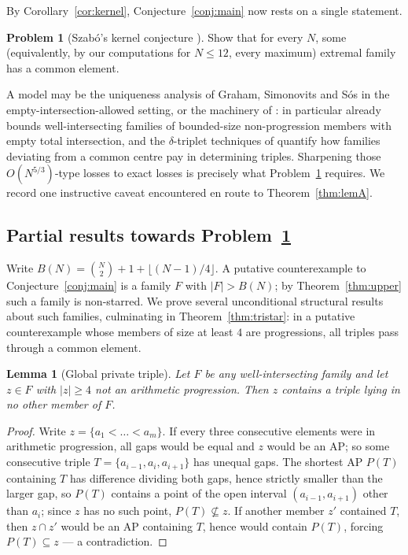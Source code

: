\documentclass[11pt]{article}
\newtheorem{lemma}[theorem]{Lemma}
\theoremstyle{definition}
\newtheorem{problem}[theorem]{Problem}
\begin{document}
By Corollary~\ref{cor:kernel}, Conjecture~\ref{conj:main} now rests on a single statement.

\begin{problem}[Szab\'o's kernel conjecture \cite{Sz99,EP272}]\label{prob:kernel}
Show that for every $N$, some (equivalently, by our computations for $N\le 12$, every maximum) extremal family has a common element.
\end{problem}

A model may be the uniqueness analysis of Graham, Simonovits and S\'os \cite{GSS80} in the empty-intersection-allowed setting, or the machinery of \cite{SiSo81,Sz99}: in particular \cite[Theorem~4]{SiSo81} already bounds well-intersecting families of bounded-size non-progression members with empty total intersection, and the $\delta$-triplet techniques of \cite{Sz99} quantify how families deviating from a common centre pay in determining triples. Sharpening those $O(N^{5/3})$-type losses to exact losses is precisely what Problem~\ref{prob:kernel} requires. We record one instructive caveat encountered en route to Theorem~\ref{thm:lemA}.

\subsection*{Partial results towards Problem~\ref{prob:kernel}}

Write $B(N)=\binom N2+1+\lfloor(N-1)/4\rfloor$. A putative counterexample to Conjecture~\ref{conj:main} is a family $F$ with $|F|>B(N)$; by Theorem~\ref{thm:upper} such a family is non-starred. We prove several unconditional structural results about such families, culminating in Theorem~\ref{thm:tristar}: in a putative counterexample whose members of size at least $4$ are progressions, all triples pass through a common element.

\begin{lemma}[Global private triple]\label{lem:gpt}
Let $F$ be any well-intersecting family and let $z\in F$ with $|z|\ge4$ not an arithmetic progression. Then $z$ contains a triple lying in no other member of $F$.
\end{lemma}

\begin{proof}
Write $z=\{a_1<\dots<a_m\}$. If every three consecutive elements were in arithmetic progression, all gaps would be equal and $z$ would be an AP; so some consecutive triple $T=\{a_{i-1},a_i,a_{i+1}\}$ has unequal gaps. The shortest AP $P(T)$ containing $T$ has difference dividing both gaps, hence strictly smaller than the larger gap, so $P(T)$ contains a point of the open interval $(a_{i-1},a_{i+1})$ other than $a_i$; since $z$ has no such point, $P(T)\not\subseteq z$. If another member $z'$ contained $T$, then $z\cap z'$ would be an AP containing $T$, hence would contain $P(T)$, forcing $P(T)\subseteq z$ --- a contradiction.
\end{proof}
\end{document}
